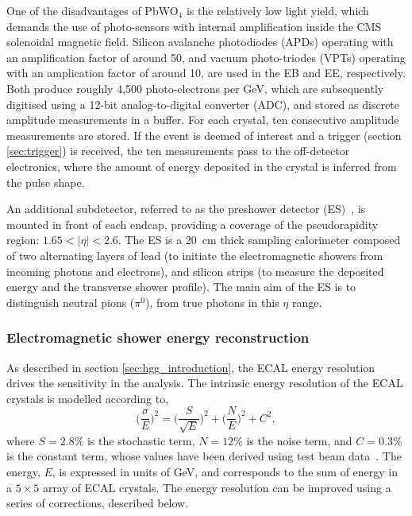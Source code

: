 One of the disadvantages of PbWO$_4$ is the relatively low light yield, which demands the use of photo-sensors with internal amplification inside the CMS solenoidal magnetic field. Silicon avalanche photodiodes (APDs) operating with an amplification factor of around 50, and vacuum photo-triodes (VPTs) operating with an amplication factor of around 10, are used in the EB and EE, respectively. Both produce roughly 4,500 photo-electrons per GeV, which are subsequently digitised using a 12-bit analog-to-digital converter (ADC), and stored as discrete amplitude measurements in a buffer. For each crystal, ten consecutive amplitude measurements are stored. If the event is deemed of interest and a trigger (section \ref{sec:trigger}) is received, the ten measurements pass to the off-detector electronics, where the amount of energy deposited in the crystal is inferred from the pulse shape.

An additional subdetector, referred to as the preshower detector (ES)~\cite{}, is mounted in front of each endcap, providing a coverage of the pseudorapidity region: $1.65<|\eta|<2.6$. The ES is a 20~cm thick sampling calorimeter composed of two alternating layers of lead (to initiate the electromagnetic showers from incoming photons and electrons), and silicon strips (to measure the deposited energy and the transverse shower profile). The main aim of the ES is to distinguish neutral pions ($\pi^0$), from true photons in this $\eta$ range. 

\subsubsection{Electromagnetic shower energy reconstruction}
As described in section \ref{sec:hgg_introduction}, the ECAL energy resolution drives the sensitivity in the \Hgg analysis. The intrinsic energy resolution of the ECAL crystals is modelled according to,
\begin{equation}
    \Big(\frac{\sigma}{E}\Big)^2 =  \Big(\frac{S}{\sqrt{E}}\Big)^2 + \Big(\frac{N}{E}\Big)^2 + C^2,
\end{equation}
\noindent
where $S=2.8\%$ is the stochastic term, $N=12\%$ is the noise term, and $C=0.3\%$ is the constant term, whose values have been derived using test beam data~\cite{}. The energy, $E$, is expressed in units of GeV, and corresponds to the sum of energy in a $5\times5$ array of ECAL crystals. The energy resolution can be improved using a series of corrections, described below.


